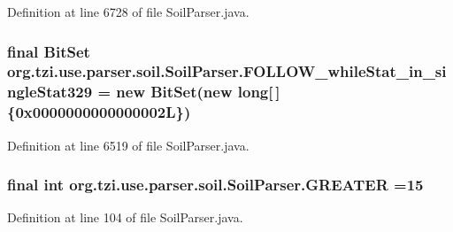 Definition at line 6728 of file Soil\-Parser.\-java.

\hypertarget{classorg_1_1tzi_1_1use_1_1parser_1_1soil_1_1_soil_parser_a4311ad7f99fe1325ccca9221da2aefb8}{
\subsubsection[{F\-O\-L\-L\-O\-W\-\_\-while\-Stat\-\_\-in\-\_\-single\-Stat329}]{\setlength{\rightskip}{0pt plus 5cm}final Bit\-Set org.\-tzi.\-use.\-parser.\-soil.\-Soil\-Parser.\-F\-O\-L\-L\-O\-W\-\_\-while\-Stat\-\_\-in\-\_\-single\-Stat329 = new Bit\-Set(new long\mbox{[}$\,$\mbox{]}\{0x0000000000000002\-L\})\hspace{0.3cm}{\ttfamily [static]}}}\label{classorg_1_1tzi_1_1use_1_1parser_1_1soil_1_1_soil_parser_a4311ad7f99fe1325ccca9221da2aefb8}


Definition at line 6519 of file Soil\-Parser.\-java.

\hypertarget{classorg_1_1tzi_1_1use_1_1parser_1_1soil_1_1_soil_parser_aa560ae2ee1e6aace0c4166a2b6f2e8d5}{
\subsubsection[{G\-R\-E\-A\-T\-E\-R}]{\setlength{\rightskip}{0pt plus 5cm}final int org.\-tzi.\-use.\-parser.\-soil.\-Soil\-Parser.\-G\-R\-E\-A\-T\-E\-R =15\hspace{0.3cm}{\ttfamily [static]}}}\label{classorg_1_1tzi_1_1use_1_1parser_1_1soil_1_1_soil_parser_aa560ae2ee1e6aace0c4166a2b6f2e8d5}


Definition at line 104 of file Soil\-Parser.\-java.


